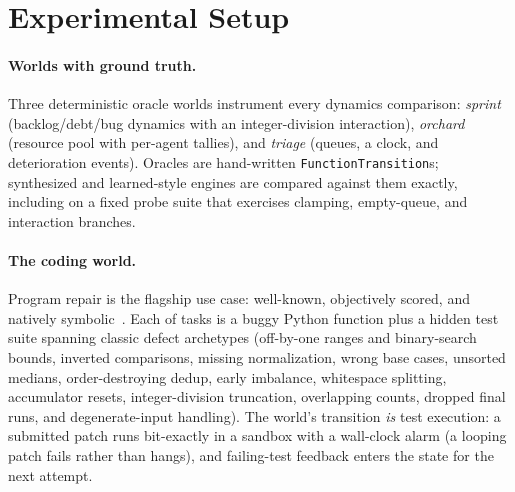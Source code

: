 \documentclass[11pt]{article}
\begin{document}
\section{Experimental Setup}
\paragraph{Worlds with ground truth.} Three deterministic oracle worlds
instrument every dynamics comparison: \emph{sprint} (backlog/debt/bug
dynamics with an integer-division interaction), \emph{orchard} (resource pool
with per-agent tallies), and \emph{triage} (queues, a clock, and
deterioration events). Oracles are hand-written
\texttt{FunctionTransition}s; synthesized and learned-style engines are
compared against them exactly, including on a fixed probe suite that
exercises clamping, empty-queue, and interaction branches.

\paragraph{The coding world.} Program repair is the flagship use case:
well-known, objectively scored, and natively symbolic~\cite{humaneval2021}.
Each of \NumTasks{} tasks is a buggy Python function plus a hidden test suite
spanning classic defect archetypes (off-by-one ranges and binary-search
bounds, inverted comparisons, missing normalization, wrong base cases,
unsorted medians, order-destroying dedup, early imbalance, whitespace
splitting, accumulator resets, integer-division truncation, overlapping
counts, dropped final runs, and degenerate-input handling). The world's
transition \emph{is} test execution: a submitted patch runs bit-exactly in a
sandbox with a wall-clock alarm (a looping patch fails rather than hangs),
and failing-test feedback enters the state for the next attempt.
\end{document}
